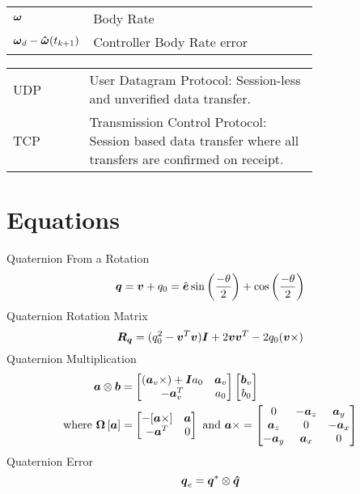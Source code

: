 \begin{nomenclature}
\begin{tabular}{lp{0.75\linewidth}}
  $\boldsymbol{\omega}$ & Body Rate \\
  $\boldsymbol{\omega}_d - \boldsymbol{\hat{\omega}}(t_{k+1})$ & Controller Body Rate error \\
\end{tabular}

\begin{tabular}{lp{0.75\linewidth}}
  UDP & User Datagram Protocol: Session-less and unverified data transfer. \\
  TCP & Transmission Control Protocol: Session based data transfer where all transfers are confirmed on receipt. \\
\end{tabular}

\section{Equations}
Quaternion From a Rotation
\begin{equation} \boldsymbol{q} = \boldsymbol{v} + q_0 = \hat{\boldsymbol{e}} \sin \left( \frac{-\theta}{2} \right) + \cos \left( \frac{-\theta}{2} \right) \end{equation}
Quaternion Rotation Matrix
\begin{equation}
  \boldsymbol{R_q} = (q_0^2 - \boldsymbol{v}^T \boldsymbol{v}) \boldsymbol{I} + 2 \boldsymbol{v} \boldsymbol{v}^T - 2 q_0 (\boldsymbol{v} \times)
\end{equation}
Quaternion Multiplication
\begin{equation}
  \begin{aligned}
    \boldsymbol{a} \otimes \boldsymbol{b} &=
    \begin{bmatrix}
      (\boldsymbol{a}_v \times) + \boldsymbol{I} a_0 & \boldsymbol{a}_v \\
      -\boldsymbol{a}_v^T                    & a_0 \\
    \end{bmatrix}
    \begin{bmatrix}
    \boldsymbol{b}_v \\ b_0
    \end{bmatrix} \\
    \text{where } \boldsymbol{\Omega} \left[ \boldsymbol{a} \right] &=
    \begin{bmatrix}
      - [ \boldsymbol{a} \times ] & \boldsymbol{a} \\
      - \boldsymbol{a}^T & 0
    \end{bmatrix} \text{ and }
    \boldsymbol{a} \times =
    \begin{bmatrix}
      0 & -\boldsymbol{a}_z & \boldsymbol{a}_y \\
      \boldsymbol{a}_z & 0 & -\boldsymbol{a}_x \\
      -\boldsymbol{a}_y & \boldsymbol{a}_x & 0 \\
    \end{bmatrix}
  \end{aligned}
\end{equation}
Quaternion Error
\begin{equation}
  \boldsymbol{q}_e = \boldsymbol{q}^* \otimes \boldsymbol{\hat{q}}
\end{equation}


\end{nomenclature}
